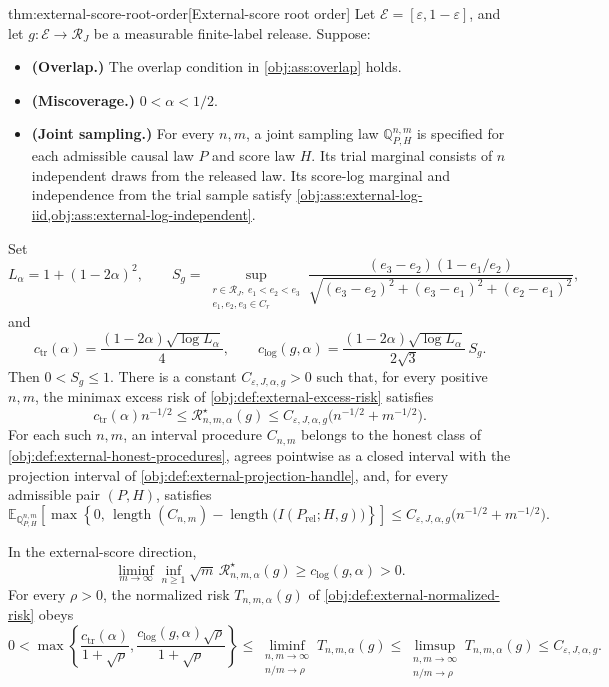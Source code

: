 \documentclass[11pt]{article}
\begin{document}
\begin{theoremv}{thm:external-score-root-order}[External-score root order]
Let \(\mathcal E=[\varepsilon,1-\varepsilon]\), and let \(g:\mathcal E\to\mathcal R_J\) be a measurable finite-label release. Suppose:

\begin{itemize}
\item \textbf{(Overlap.)} The overlap condition in \cref{obj:ass:overlap} holds.
\item \textbf{(Miscoverage.)} \(0<\alpha<1/2\).
\item \textbf{(Joint sampling.)} For every \(n,m\), a joint sampling law \(\mathbb Q_{P,H}^{n,m}\) is specified for each admissible causal law \(P\) and score law \(H\). Its trial marginal consists of \(n\) independent draws from the released law. Its score-log marginal and independence from the trial sample satisfy \cref{obj:ass:external-log-iid,obj:ass:external-log-independent}.
\end{itemize}

Set
\[
L_\alpha=1+(1-2\alpha)^2,\qquad
S_g=
\sup_{\substack{r\in\mathcal R_J,\ e_1<e_2<e_3\\
e_1,e_2,e_3\in C_r}}
\frac{(e_3-e_2)(1-e_1/e_2)}
{\sqrt{(e_3-e_2)^2+(e_3-e_1)^2+(e_2-e_1)^2}},
\]
and
\[
c_{\mathrm{tr}}(\alpha)
=\frac{(1-2\alpha)\sqrt{\log L_\alpha}}{4},
\qquad
c_{\mathrm{log}}(g,\alpha)
=\frac{(1-2\alpha)\sqrt{\log L_\alpha}}{2\sqrt3}\,S_g.
\]
Then \(0<S_g\le 1\). There is a constant \(C_{\varepsilon,J,\alpha,g}>0\) such that, for every positive \(n,m\), the minimax excess risk of \cref{obj:def:external-excess-risk} satisfies
\[
c_{\mathrm{tr}}(\alpha)n^{-1/2}
\le \mathcal R^\star_{n,m,\alpha}(g)
\le C_{\varepsilon,J,\alpha,g}
\bigl(n^{-1/2}+m^{-1/2}\bigr).
\]
For each such \(n,m\), an interval procedure \(C_{n,m}\) belongs to the honest class of \cref{obj:def:external-honest-procedures}, agrees pointwise as a closed interval with the projection interval of \cref{obj:def:external-projection-handle}, and, for every admissible pair \((P,H)\), satisfies
\[
\mathbb E_{\mathbb Q_{P,H}^{n,m}}
\!\left[
\max\!\left\{0,\,
\operatorname{length}(C_{n,m})
-\operatorname{length}\bigl(I(P_{\mathrm{rel}};H,g)\bigr)
\right\}
\right]
\le C_{\varepsilon,J,\alpha,g}
\bigl(n^{-1/2}+m^{-1/2}\bigr).
\]

In the external-score direction,
\[
\liminf_{m\to\infty}\inf_{n\ge1}
\sqrt m\,\mathcal R^\star_{n,m,\alpha}(g)
\ge c_{\mathrm{log}}(g,\alpha)>0.
\]
For every \(\rho>0\), the normalized risk \(T_{n,m,\alpha}(g)\) of \cref{obj:def:external-normalized-risk} obeys
\[
0<
\max\left\{
\frac{c_{\mathrm{tr}}(\alpha)}{1+\sqrt\rho},
\frac{c_{\mathrm{log}}(g,\alpha)\sqrt\rho}{1+\sqrt\rho}
\right\}
\le
\liminf_{\substack{n,m\to\infty\\ n/m\to\rho}}
T_{n,m,\alpha}(g)
\le
\limsup_{\substack{n,m\to\infty\\ n/m\to\rho}}
T_{n,m,\alpha}(g)
\le C_{\varepsilon,J,\alpha,g}.
\]
\end{theoremv}
\end{document}
